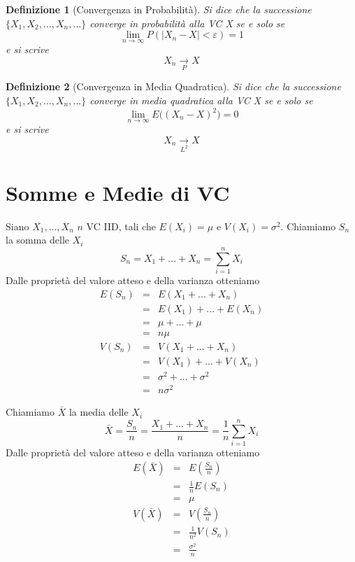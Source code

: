 \documentclass[
  11pt,
]{book}
\theoremstyle{mytheoremstyle}
\theoremstyle{mydefstyle}
\newtheorem{definition}{Definizione}[section]
\begin{document}
\begin{definition}[Convergenza in Probabilità]
Si dice che la successione \(\{X_1,X_2,...,X_n,...\}\) converge in
probabilità alla VC X se e solo se
\[\lim_{n\to\infty}P(|X_n-X|<\varepsilon)=1\]e si scrive
\[X_n\operatorname*{\rightarrow}_{P} X\]
\end{definition}

\begin{definition}[Convergenza in Media Quadratica]
Si dice che la successione \(\{X_1,X_2,...,X_n,...\}\) converge in media
quadratica alla VC X se e solo se
\[\lim_{n\to\infty}E\big((X_n-X)^2\big)=0\]e si scrive
\[X_n\operatorname*{\rightarrow}_{L^2} X\]
\end{definition}

\section{Somme e Medie di VC}\label{somme-e-medie-di-vc}

Siano \(X_1,...,X_n\) \(n\) VC IID, tali che \(E(X_i)=\mu\) e
\(V(X_i)=\sigma^2\). Chiamiamo \(S_n\) la somma delle \(X_i\)
\[S_n =X_1+...+X_n=\sum_{i=1}^nX_i\] Dalle proprietà del valore atteso e
della varianza otteniamo \begin{eqnarray*}
   E(S_n) &=&  E(X_1+...+X_n)\\
   &=& E(X_1)+...+E(X_n)\\
   &=& \mu+...+\mu\\
   &=& n\mu\\
   V(S_n) &=&  V(X_1+...+X_n)\\
   &=& V(X_1)+...+V(X_n)\\
   &=& \sigma^2+...+\sigma^2\\
   &=& n\sigma^2
\end{eqnarray*}

Chiamiamo \(\bar X\) la media delle \(X_i\)
\[\bar X= \frac{S_n}n =\frac{X_1+...+X_n}n=\frac 1n\sum_{i=1}^nX_i\]
Dalle proprietà del valore atteso e della varianza otteniamo
\begin{eqnarray*}
   E(\bar X) &=&  E\left(\frac{S_n}{n}\right)\\
   &=& \frac 1n E(S_n)\\
   &=& \mu\\
   V\left(\bar X\right) &=&  V\left(\frac{S_n}{n}\right)\\
   &=& \frac 1{n^2}V(S_n)\\
   &=& \frac {\sigma^2}n 
\end{eqnarray*}
\end{document}
